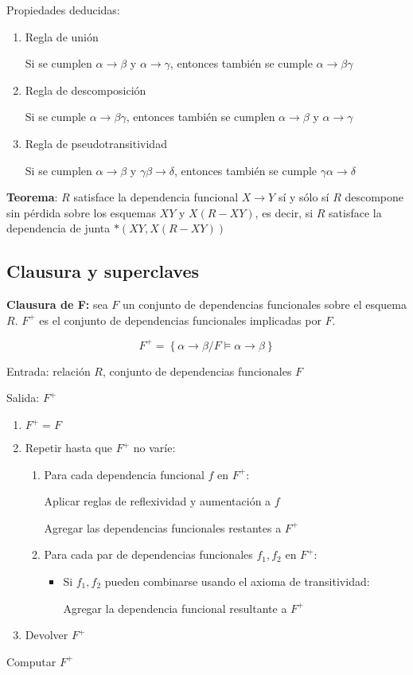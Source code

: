 \documentclass[a4paper, twoside]{article}
\begin{document}
Propiedades deducidas:
\begin{enumerate}
	\item Regla de unión

	Si se cumplen $\alpha\to\beta$ y $\alpha\to\gamma$, entonces también se cumple $\alpha\to\beta\gamma$

	\item Regla de descomposición

	Si se cumple $\alpha\to\beta\gamma$, entonces también se cumplen $\alpha\to\beta$ y $\alpha\to\gamma$

	\item Regla de pseudotransitividad

	Si se cumplen $\alpha\to\beta$ y $\gamma\beta\to\delta$, entonces también se cumple $\gamma\alpha\to\delta$
\end{enumerate}

\textbf{Teorema}: $R$ satisface la dependencia funcional $X\to Y$ sí y sólo sí $R$ descompone sin pérdida sobre los esquemas $XY$ y $X(R-XY)$, es decir, si $R$ satisface la dependencia de junta $*\left( XY, X(R-XY) \right)$

\subsection{Clausura y superclaves}
\textbf{Clausura de F:} sea $F$ un conjunto de dependencias funcionales sobre el esquema $R$. $F^{+}$ es el conjunto de dependencias funcionales implicadas por $F$.

\[
	F^{+}=\left\{ \alpha\to\beta/F\vDash\alpha\to\beta\right\} 
\]

\begin{algorithm}[H]
	Entrada: relación $R$, conjunto de dependencias funcionales $F$

	Salida: $F^{+}$
	\begin{enumerate}
		\item $F^{+}=F$

		\item Repetir hasta que $F^{+}$ no varíe:
		\begin{enumerate}
			\item Para cada dependencia funcional $f$ en $F^{+}$:

			Aplicar reglas de reflexividad y aumentación a $f$

			Agregar las dependencias funcionales restantes a $F^{+}$

			\item Para cada par de dependencias funcionales $f_{1},f_{2}$ en $F^{+}$:
			\begin{itemize}
				\item Si $f_{1},f_{2}$ pueden combinarse usando el axioma de transitividad:

				Agregar la dependencia funcional resultante a $F^{+}$
			\end{itemize}
		\end{enumerate}

		\item Devolver $F^{+}$
	\end{enumerate}
	\caption{Computar $F^{+}$}
\end{algorithm}
\end{document}
